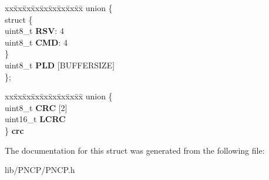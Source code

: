 \begin{DoxyCompactItemize}
\begin{tabbing}
\end{tabbing}\item 
\mbox{\label{struct_p_n_c_p_1_1_f_r_a_m_e_a1fbaf3058d1ed6968ed1252ca7bcc5f9}} 
\begin{tabbing}
xx\=xx\=xx\=xx\=xx\=xx\=xx\=xx\=xx\=\kill
union \{\\
\mbox{\label{union_p_n_c_p_1_1_f_r_a_m_e_1_1_0D2_a66081d7fd81353f153f87599e232986c}} 
\>struct \{\\
\>\>uint8\_t {\bfseries RSV}: 4\\
\>\>uint8\_t {\bfseries CMD}: 4\\
\>\} \\
\>uint8\_t {\bfseries PLD} \mbox{[}BUFFERSIZE\mbox{]}\\
\}; \\

\end{tabbing}\item 
\mbox{\label{struct_p_n_c_p_1_1_f_r_a_m_e_a574c3a69496acdcaf8ff7596a4c72b80}} 
\begin{tabbing}
xx\=xx\=xx\=xx\=xx\=xx\=xx\=xx\=xx\=\kill
union \{\\
\>uint8\_t {\bfseries CRC} \mbox{[}2\mbox{]}\\
\>uint16\_t {\bfseries LCRC}\\
\} {\bfseries crc}\\

\end{tabbing}\end{DoxyCompactItemize}


The documentation for this struct was generated from the following file\+:\begin{DoxyCompactItemize}
\item 
lib/\+P\+N\+C\+P/P\+N\+C\+P.\+h\end{DoxyCompactItemize}
